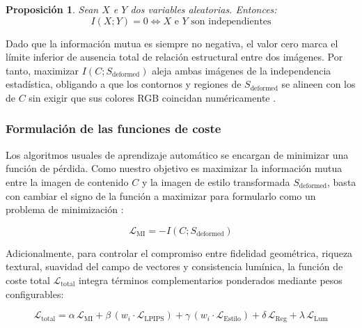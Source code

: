 \documentclass[a4paper]{article}
\newtheorem{proposicion}{Proposición}[section]
\begin{document}
\vspace{0.3cm}

\begin{proposicion}
Sean $X$ e $Y$ dos variables aleatorias. Entonces:
\[I(X; Y) = 0 \iff X \text{ e } Y \text{ son independientes}\]
\end{proposicion}

\vspace{0.3cm}

\noindent Dado que la información mutua es siempre no negativa, el valor cero marca el límite inferior de ausencia total de relación estructural entre dos imágenes. Por tanto, maximizar $I(C; S_{\text{deformed}})$ aleja ambas imágenes de la independencia estadística, obligando a que los contornos y regiones de $S_{\text{deformed}}$ se alineen con los de $C$ sin exigir que sus colores RGB coincidan numéricamente \cite{viola1997alignment, zamzam2025pixelshuffler}.

\subsubsection{Formulación de las funciones de coste}

\noindent Los algoritmos usuales de aprendizaje automático se encargan de minimizar una función de pérdida. Como nuestro objetivo es maximizar la información mutua entre la imagen de contenido $C$ y la imagen de estilo transformada $S_{\text{deformed}}$, basta con cambiar el signo de la función a maximizar para formularlo como un problema de minimización \cite{zamzam2025pixelshuffler}:

\[\mathcal{L}_{\text{MI}} = - I(C; S_{\text{deformed}})\]

\noindent Adicionalmente, para controlar el compromiso entre fidelidad geométrica, riqueza textural, suavidad del campo de vectores y consistencia lumínica, la función de coste total $\mathcal{L}_{\text{total}}$ integra términos complementarios ponderados mediante pesos configurables:

\[\mathcal{L}_{\text{total}} = \alpha \, \mathcal{L}_{\text{MI}} + \beta \, (w_i \cdot \mathcal{L}_{\text{LPIPS}}) + \gamma \, (w_i \cdot \mathcal{L}_{\text{Estilo}}) + \delta \, \mathcal{L}_{\text{Reg}} + \lambda \, \mathcal{L}_{\text{Lum}}\]
\end{document}
